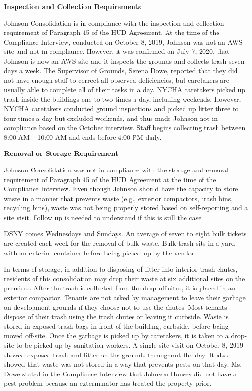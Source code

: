 
\textbf{Inspection and Collection Requirement}s

Johnson Consolidation is in compliance with the inspection and collection requirement of Paragraph 45 of the HUD Agreement. At the time of the Compliance Interview, conducted on October 8, 2019, Johnson was not an AWS site and not in compliance. However, it was confirmed on July 7, 2020, that Johnson is now an AWS site and it inspects the grounds and collects trash seven days a week. The Supervisor of Grounds, Serena Dowe, reported that they did not have enough staff to correct all observed deficiencies, but caretakers are usually able to complete all of their tasks in a day. NYCHA caretakers picked up trash inside the buildings one to two times a day, including weekends. However, NYCHA caretakers conducted ground inspections and picked up litter three to four times a day but excluded weekends, and thus made Johnson not in compliance based on the October interview. Staff begins collecting trash between 8:00 AM -- 10:00 AM and ends before 4:00 PM daily.

\textbf{Removal or Storage Requirement}

Johnson Consolidation was not in compliance with the storage and removal requirement of Paragraph 45 of the HUD Agreement at the time of the Compliance Interview. Even though Johnson should have the capacity to store waste in a manner that prevents waste (e.g., exterior compactors, trash bins, recycling bins), waste was not being properly stored based on self-reporting and a site visit. Follow up is needed to understand if this is still the case. 



DSNY comes Wednesdays and Sundays. An average of seven to eight bulk tickets are created each week for the removal of bulk waste. Bulk trash sits in a yard with an exterior container before being picked up by the vendor.

In terms of storage, in addition to disposing of litter into interior trash chutes, residents of this consolidation may drop their waste at six additional sites on the premises. After the trash is collected from the drop-off sites, it is placed in an exterior compactor. Tenants are not asked by management to leave their garbage on development grounds if they choose not to use the chutes. Most tenants dispose of their trash using the trash chutes or leaving it curbside. Waste is stored in exposed trash bags in front of the building, curbside, before being moved off-site. Once the garbage is picked up by caretakers, it is taken to a drop-site to be picked up by sanitation workers. A single site visit on October 8, 2019 showed exposed trash and litter on the grounds throughout the day. It also showed that waste was not stored in a way that prevents pests on that day. Ms. Dowe stated in the Compliance Interview that Johnson Houses did not have a pest problem because an exterminator has treated the property prior.

